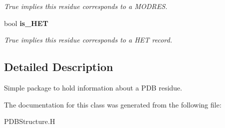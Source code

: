 \begin{CompactItemize}
\begin{CompactList}\small\item\em True implies this residue corresponds to a MODRES. \item\end{CompactList}\item 
bool \bf{is\_\-HET}\label{classASCbase_1_1residue__t_78e29c2b3e395dae09614d59d45309d4}

\begin{CompactList}\small\item\em True implies this residue corresponds to a HET record. \item\end{CompactList}\end{CompactItemize}


\subsection{Detailed Description}
Simple package to hold information about a PDB residue. 



The documentation for this class was generated from the following file:\begin{CompactItemize}
\item 
PDBStructure.H\end{CompactItemize}
